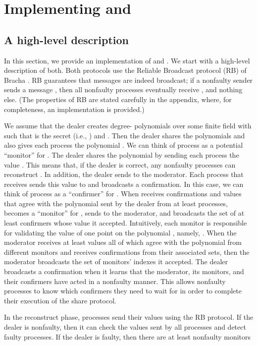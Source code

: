 \documentclass{sig-alternate}
\newcommand{\mwdavss}{\text{MW-SVSS}\xspace}
\newcommand{\DMM}{\text{DMM}\xspace}
\begin{document}
\section{Implementing \DMM and \mwdavss}\label{sec:MWFD-AVSS}


\subsection{A high-level description}\label{sec:high-level}
In this section, we provide an implementation of \DMM and \mwdavss.
We start with
a high-level description of both.
Both protocols use the Reliable Broadcast protocol (RB) of
Bracha \cite{Bra84}.
RB guarantees that messages are
indeed broadcast; if a nonfaulty sender sends a message , then all
nonfaulty processes eventually receive , and nothing else.
(The properties of RB are stated carefully in the appendix,
where, for completeness, an implementation is provided.)

We assume that the dealer
creates  degree- polynomials 
over some finite field  with 
such that 
is the secret
(i.e., )
and . Then the dealer shares the
polynomials   and also gives
each process  the polynomial .
We can think of process  as a
potential ``monitor'' for .
The dealer shares the polynomial  by sending each process  the
value .  This means that, if the dealer is correct, any 
nonfaulty processes can reconstruct .
In addition, the dealer sends  to the moderator.
Each process  that receives  sends this value to  and
broadcasts a confirmation.
In this case, we can think of process  as a ``confirmer'' for .
When
 receives confirmations and values that agree with the polynomial
 sent by the dealer from at least  processes,
 becomes a ``monitor'' for , sends
 to the moderator, and broadcasts the set  of
at least
 confirmers
whose value it
accepted. Intuitively, each monitor 
is responsible for validating
the value of one
point on the polynomial , namely,
.
When the moderator receives
at least
 values all of which agree with the polynomial  from different
monitors
and receives confirmations from their associated  sets, then the moderator
broadcasts the
set of  monitors' indexes it accepted. The dealer broadcasts a
confirmation when it learns that the moderator, its monitors, and their
confirmers have
acted in a nonfaulty manner.
This allows nonfaulty processes to know which confirmers they need to
wait for in order to complete their execution of the share protocol.



In the reconstruct phase, processes send their values using the RB
protocol. If the dealer is nonfaulty, then
it can check  the values sent by all processes and detect faulty processes.
If the dealer is faulty, then there are at least  nonfaulty monitors
\end{document}
